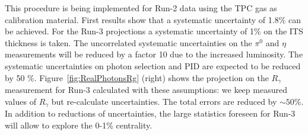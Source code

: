 This procedure is being implemented for Run-2 data using the TPC gas as calibration material. First results show that a systematic uncertainty of 1.8\% can be achieved. For the Run-3 projections a systematic uncertainty of 1\% on the ITS thickness is taken. The uncorrelated systematic uncertainties on the $\pi^0$ and $\eta$ measurements will be reduced by a factor 10 due to the increased luminosity. The systematic uncertainties on photon selection and PID are expected to be reduced by 50 \%.
Figure~\ref{fig:RealPhotonsRg} (right) shows the projection on the $R_\gamma$ measurement 
for Run-3 calculated with these assumptions: we keep measured values of $R_\gamma$ but re-calculate uncertainties. The total errors are reduced by $\sim50$\%. In addition to reductions of uncertainties, the large statistics foreseen for Run-3 will allow to explore the 0-1\% centrality. 





